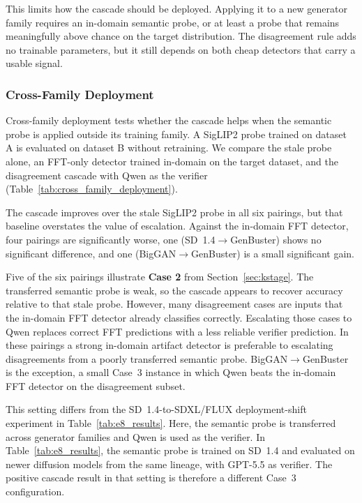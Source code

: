 \documentclass{ieeeaccess}
\begin{document}
This limits how the cascade should be deployed. Applying it to a new generator family
requires an in-domain semantic probe, or at least a probe that remains meaningfully above
chance on the target distribution. The disagreement rule adds no trainable parameters,
but it still depends on both cheap detectors that carry a usable signal.

\subsubsection{Cross-Family Deployment}
\label{sec:cross_family_deployment}

Cross-family deployment tests whether the cascade helps when the semantic probe is
applied outside its training family. A SigLIP2 probe trained on dataset A is evaluated
on dataset B without retraining. We compare the stale probe alone, an FFT-only detector
trained in-domain on the target dataset, and the disagreement cascade with Qwen as the
verifier (Table~\ref{tab:cross_family_deployment}). 

The cascade improves over the stale SigLIP2 probe in all six pairings, but that baseline overstates the value of escalation. Against the in-domain FFT detector, four pairings are significantly worse, one (SD~1.4$\to$GenBuster) shows no significant difference, and one (BigGAN$\to$GenBuster) is a small significant gain.

Five of the six pairings illustrate \textbf{Case 2} from Section~\ref{sec:kstage}. The
transferred semantic probe is weak, so the cascade appears to recover accuracy relative
to that stale probe. However, many disagreement cases are inputs that the in-domain FFT
detector already classifies correctly. Escalating those cases to Qwen replaces correct
FFT predictions with a less reliable verifier prediction. In these pairings a strong
in-domain artifact detector is preferable to escalating disagreements from a poorly
transferred semantic probe. BigGAN$\to$GenBuster is the exception, a small Case~3 instance in which Qwen beats the in-domain FFT detector on the disagreement subset.

This setting differs from the SD~1.4-to-SDXL/FLUX deployment-shift experiment in
Table~\ref{tab:e8_results}. Here, the semantic probe is transferred across generator
families and Qwen is used as the verifier. In Table~\ref{tab:e8_results}, the semantic
probe is trained on SD~1.4 and evaluated on newer diffusion models from the same lineage,
with GPT-5.5 as verifier. The positive cascade result in that setting is therefore a
different Case~3 configuration.
\end{document}
